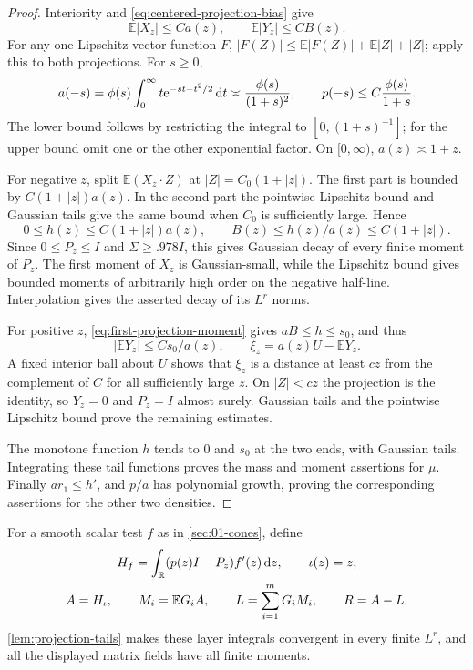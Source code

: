 \begin{proof}
Interiority and \eqref{eq:centered-projection-bias} give
\[
\mathbb{E}|X_z|\le Ca(z),\qquad \mathbb{E}|Y_z|\le CB(z).
\]
For any one-Lipschitz vector function $F$, $|F(Z)|\le\mathbb{E}|F(Z)|+\mathbb{E}|Z|+|Z|$; apply this to both projections. For $s\ge0$,
\[
a(-s)=\phi(s)\int_0^\infty t \mathrm{e}^{-st-t^2/2}\,\mathrm{d} t
\asymp\frac{\phi(s)}{(1+s)^2},\qquad
p(-s)\le C\frac{\phi(s)}{1+s}.
\]
The lower bound follows by restricting the integral to $[0,(1+s)^{-1}]$; for the upper bound omit one or the other exponential factor. On $[0,\infty)$, $a(z)\asymp1+z$.

For negative $z$, split $\mathbb{E}(X_z\cdot Z)$ at $|Z|=C_0(1+|z|)$. The first part is bounded by $C(1+|z|)a(z)$. In the second part the pointwise Lipschitz bound and Gaussian tails give the same bound when $C_0$ is sufficiently large. Hence
\[
0\le h(z)\le C(1+|z|)a(z),\qquad B(z)\le h(z)/a(z)\le C(1+|z|).
\]
Since $0\le P_z\le I$ and $\Sigma\ge.978I$, this gives Gaussian decay of every finite moment of $P_z$. The first moment of $X_z$ is Gaussian-small, while the Lipschitz bound gives bounded moments of arbitrarily high order on the negative half-line. Interpolation gives the asserted decay of its $L^r$ norms.

For positive $z$, \eqref{eq:first-projection-moment} gives $aB\le h\le s_0$, and thus
\[
|\mathbb{E}Y_z|\le Cs_0/a(z),\qquad \xi_z=a(z)U-\mathbb{E}Y_z.
\]
A fixed interior ball about $U$ shows that $\xi_z$ is a distance at least $cz$ from the complement of $C$ for all sufficiently large $z$. On $|Z|<cz$ the projection is the identity, so $Y_z=0$ and $P_z=I$ almost surely. Gaussian tails and the pointwise Lipschitz bound prove the remaining estimates.

The monotone function $h$ tends to $0$ and $s_0$ at the two ends, with Gaussian tails. Integrating these tail functions proves the mass and moment assertions for $\mu$. Finally $ar_1\le h'$, and $p/a$ has polynomial growth, proving the corresponding assertions for the other two densities.
\end{proof}

For a smooth scalar test $f$ as in \cref{sec:01-cones}, define
\begin{equation}
\begin{gathered}
H_f=\int_{\mathbb{R}}(p(z)I-P_z)f'(z)\,\mathrm{d} z,\qquad \iota(z)=z,\\
A=H_\iota,\qquad M_i=\mathbb{E} G_iA,\qquad
L=\sum_{i=1}^mG_iM_i,\qquad R=A-L.
\end{gathered}\label{eq:gaussian-linear-part}
\end{equation}
\cref{lem:projection-tails} makes these layer integrals convergent in every finite $L^r$, and all the displayed matrix fields have all finite moments.


